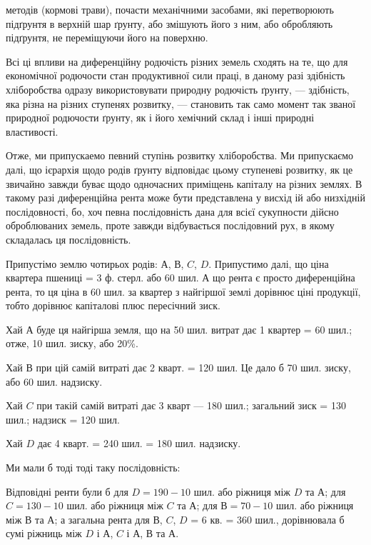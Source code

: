 \parcont{}  %
методів (кормові трави), почасти механічними засобами, які перетворюють
підґрунтя в верхній шар ґрунту, або змішують його з ним, або обробляють підґрунтя,
не переміщуючи його на поверхню.

Всі ці впливи на диференційну родючість різних земель сходять на те, що для
економічної родючости стан продуктивної сили праці, в даному разі здібність хліборобства
одразу використовувати природну родючість ґрунту, — здібність, яка різна
на різних ступенях розвитку, — становить так само момент так званої природної
родючости ґрунту, як і його хемічний склад і інші природні властивості.

Отже, ми припускаемо певний ступінь розвитку хліборобства. Ми припускаємо
далі, що ієрархія щодо родів ґрунту відповідає цьому ступеневі розвитку,
як це звичайно завжди буває щодо одночасних приміщень капіталу на різних
землях. В такому разі диференційна рента може бути представлена у висхід ій
або низхідній послідовності, бо, хоч певна послідовність дана для всієї сукупности
дійсно оброблюваних земель, проте завжди відбувається послідовний рух,
в якому складалась ця послідовність.

Припустімо землю чотирьох родів: $А$, $В$, $C$, $D$. Припустимо далі, що ціна
квартера пшениці = 3 ф. стерл. або 60 шил. А що рента є просто диференційна рента,
то ця ціна в 60 шил. за квартер з найгіршої землі дорівнює ціні продукції,
тобто дорівнює капіталові плюс пересічний зиск.

Хай $А$ буде ця найгірша земля, що на 50 шил. витрат дає 1 квартер = 60
шил.; отже, 10 шил. зиску, або 20\%.

Хай $В$ при цій самій витраті дає 2 кварт. = 120 шил. Це дало б 70 шил.
зиску, або 60 шил. надзиску.

Хай $C$ при такій самій витраті дає 3 кварт — 180 шил.; загальний
зиск = 130 шил.; надзиск = 120 шил.

Хай $D$ дає 4 кварт. = 240 шил. = 180 шил. надзиску.

Ми мали б тоді тоді таку послідовність:

Відповідні ренти були б для $D = 190 - 10$ шил. або ріжниця між $D$ та
$А$; для $C = 130 - 10$ шил. або ріжниця між $C$ та $А$; для $В = 70 - 10$ шил. або ріжниця
між $В$ та $А$; а загальна рента для $В$, $C$, $D$ = 6 кв. = 360 шил., дорівнювала б сумі ріжниць між
$D$ і $А$, $C$ і $А$, $В$ та $А$.


